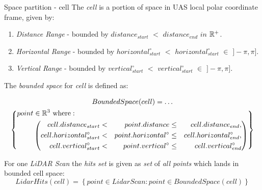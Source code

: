 \begin{definition}{Space partition - cell}\label{def:cell}
    The \emph{cell} is a portion of space in UAS local polar coordinate frame, given by:
    \begin{enumerate}
        \item \emph{Distance Range} -  bounded by $distance_{start}$ $<$ $distance_{end}$ $in$ $\mathbb{R}^+$.
        \item \emph{Horizontal Range} - bounded by $horizontal^\circ_{start}$ $<$ $horizontal^\circ_{start}$ $\in$ $]-\pi,\pi]$.
        \item \emph{Vertical Range} - bounded by $vertical^\circ_{start}$ $<$ $vertical^\circ_{start}$ $\in$ $]-\pi,\pi]$.
    \end{enumerate}
    
    \newpage\noindent The \emph{bounded space} for \emph{cell} is defined as:
    
    \begin{multline}\label{eq:boundedSpaceCell}
        Bounded Space(cell)=\dots\\
            \left \{
                \begin{aligned}
                point& \in \mathbb{R}^3 \text{ where}:\\
                    &\left(\begin{aligned}
                        cell.distance_{start} &<& point.distance &\le& cell.distance_{end},\\
                        cell.horizontal^\circ_{start} &<& point.horizontal^\circ &\le&  cell.horizontal^\circ_{end},\\
                        cell.vertical^\circ_{start} &<& point.vertical^\circ &\le& cell.vertical^\circ_{end}\\
                    \end{aligned}\right)
                \end{aligned}
            \right\}
    \end{multline}
    
    \noindent For one \emph{LiDAR Scan} the \emph{hits set} is given as \emph{set} of \emph{all points} which lands in bounded cell space:
    \begin{equation}\label{eq:LidarHitsCell}
        Lidar Hits (cell) = \left\{point \in Lidar Scan:  point \in Bounded Space(cell)\right\}    
    \end{equation}
    

\end{definition}
